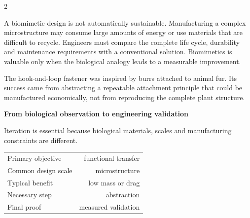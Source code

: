 \begin{multicols}{2}
\begin{ecarticle}
A biomimetic design is not automatically sustainable. Manufacturing a complex microstructure may
consume large amounts of energy or use materials that are difficult to recycle. Engineers must compare
the complete life cycle, durability and maintenance requirements with a conventional solution.
Biomimetics is valuable only when the biological analogy leads to a measurable improvement.
\end{ecarticle}

\begin{tcolorbox}[title=\sffamily\bfseries Engineering Insight,colback=yellow!10,colframe=ECOrange]
The hook-and-loop fastener was inspired by burrs attached to animal fur. Its success came from
abstracting a repeatable attachment principle that could be manufactured economically, not from
reproducing the complete plant structure.
\end{tcolorbox}

\begin{engineeringfocus}
\textbf{From biological observation to engineering validation}
\begin{center}
\end{center}
Iteration is essential because biological materials, scales and manufacturing constraints are different.
\end{engineeringfocus}

\begin{keyfigures}
\begin{tabularx}{\linewidth}{@{}Xr@{}}
Primary objective & functional transfer\\
Common design scale & microstructure\\
Typical benefit & low mass or drag\\
Necessary step & abstraction\\
Final proof & measured validation
\end{tabularx}
\end{keyfigures}


\end{multicols}
